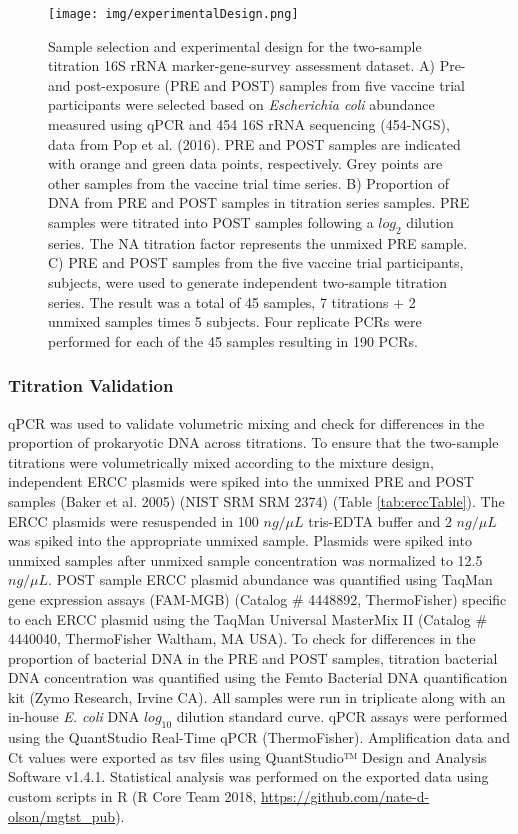 \documentclass[smallextended]{svjour3}       %
\begin{document}
\begin{figure}
\centering
\texttt{[image: img/experimentalDesign.png]}
\caption{\label{fig:countExperimentalDesign}Sample selection and
experimental design for the two-sample titration 16S rRNA
marker-gene-survey assessment dataset. A) Pre- and post-exposure (PRE
and POST) samples from five vaccine trial participants were selected
based on \textit{Escherichia coli} abundance measured using qPCR and 454
16S rRNA sequencing (454-NGS), data from Pop et al. (2016). PRE and POST
samples are indicated with orange and green data points, respectively.
Grey points are other samples from the vaccine trial time series. B)
Proportion of DNA from PRE and POST samples in titration series samples.
PRE samples were titrated into POST samples following a \(log_2\)
dilution series. The NA titration factor represents the unmixed PRE
sample. C) PRE and POST samples from the five vaccine trial
participants, subjects, were used to generate independent two-sample
titration series. The result was a total of 45 samples, 7 titrations + 2
unmixed samples times 5 subjects. Four replicate PCRs were performed for
each of the 45 samples resulting in 190 PCRs.}
\end{figure}

\hypertarget{titration-validation}{%
\subsubsection{Titration Validation}\label{titration-validation}}

qPCR was used to validate volumetric mixing and check for differences in
the proportion of prokaryotic DNA across titrations. To ensure that the
two-sample titrations were volumetrically mixed according to the mixture
design, independent ERCC plasmids were spiked into the unmixed PRE and
POST samples (Baker et al. 2005) (NIST SRM SRM 2374) (Table
\ref{tab:erccTable}). The ERCC plasmids were resuspended in 100
\(ng/\mu L\) tris-EDTA buffer and 2 \(ng/\mu L\) was spiked into the
appropriate unmixed sample. Plasmids were spiked into unmixed samples
after unmixed sample concentration was normalized to 12.5 \(ng/\mu L\).
POST sample ERCC plasmid abundance was quantified using TaqMan gene
expression assays (FAM-MGB) (Catalog \# 4448892, ThermoFisher) specific
to each ERCC plasmid using the TaqMan Universal MasterMix II (Catalog \#
4440040, ThermoFisher Waltham, MA USA). To check for differences in the
proportion of bacterial DNA in the PRE and POST samples, titration
bacterial DNA concentration was quantified using the Femto Bacterial DNA
quantification kit (Zymo Research, Irvine CA). All samples were run in
triplicate along with an in-house \emph{E. coli} DNA \(log_{10}\)
dilution standard curve. qPCR assays were performed using the
QuantStudio Real-Time qPCR (ThermoFisher). Amplification data and Ct
values were exported as tsv files using QuantStudio™ Design and Analysis
Software v1.4.1. Statistical analysis was performed on the exported data
using custom scripts in R (R Core Team 2018,
\url{https://github.com/nate-d-olson/mgtst_pub}).
\end{document}
